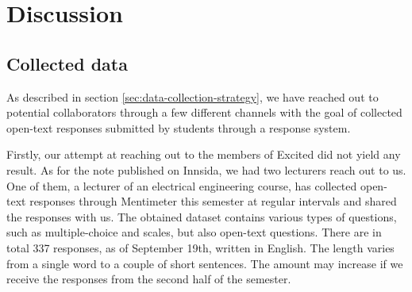 \chapter{Discussion}\label{sec:discussion}

\begin{comment}
The results chapter should simply present the results of applying the methods presented in the method chapter without further ado. This chapter will typically contain many graphs, tables, etc. Sometimes it is natural to discuss the results as they are presented, combining them into a `Results and Discussion' chapter, but more often they are kept separate.

Here you should discuss all aspect of your thesis and project. How did the process work? Which choices did you make, and what did you learn from it? What were the pros and cons? What would you have done differently if you were to undertake the same project over again, both in terms of process and product? What are the societal consequences of your work?

IT2810 - Web development
IT3021 - Game+
TET4205 - Power system analysis 2
IT3402 - Service design
Trond Morten

Innsida - Two reached out, one provided data
Excited - No response
Contact persons - 3
Co-supervisor contact - 1
Backup - Peer reviews

Do we have enough data?
\end{comment}

\section{Collected data}

As described in section \ref{sec:data-collection-strategy}, we have reached out to potential collaborators through a few different channels with the goal of collected open-text responses submitted by students through a response system.

Firstly, our attempt at reaching out to the members of Excited did not yield any result. As for the note published on Innsida, we had two lecturers reach out to us. One of them, a lecturer of an electrical engineering course, has collected open-text responses through Mentimeter this semester at regular intervals and shared the responses with us. The obtained dataset contains various types of questions, such as multiple-choice and scales, but also open-text questions. There are in total 337 responses, as of September 19th, written in English. The length varies from a single word to a couple of short sentences. The amount may increase if we receive the responses from the second half of the semester.

